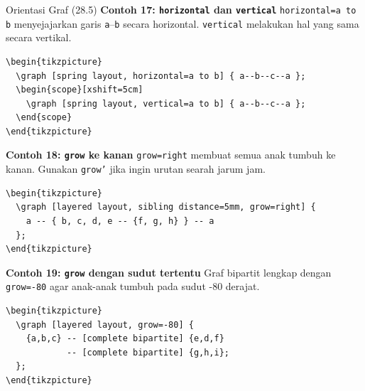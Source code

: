 \documentclass[aspectratio=169]{beamer}
\begin{document}
\begin{frame}{Orientasi Graf (28.5)}
\textbf{Contoh 17: \texttt{horizontal} dan \texttt{vertical}}
\texttt{horizontal=a to b} menyejajarkan garis \texttt{a}--\texttt{b} secara horizontal. \texttt{vertical} melakukan hal yang sama secara vertikal.
\begin{lstlisting}
\begin{tikzpicture}
  \graph [spring layout, horizontal=a to b] { a--b--c--a };
  \begin{scope}[xshift=5cm]
    \graph [spring layout, vertical=a to b] { a--b--c--a };
  \end{scope}
\end{tikzpicture}
\end{lstlisting}
\begin{center}\end{center}


\textbf{Contoh 18: \texttt{grow} ke kanan}
\texttt{grow=right} membuat semua anak tumbuh ke kanan. Gunakan \texttt{grow'} jika ingin urutan searah jarum jam.
\begin{lstlisting}
\begin{tikzpicture}
  \graph [layered layout, sibling distance=5mm, grow=right] {
    a -- { b, c, d, e -- {f, g, h} } -- a
  };
\end{tikzpicture}
\end{lstlisting}
\begin{center}\end{center}


\textbf{Contoh 19: \texttt{grow} dengan sudut tertentu}
Graf bipartit lengkap dengan \texttt{grow=-80} agar anak-anak tumbuh pada sudut -80 derajat.
\begin{lstlisting}
\begin{tikzpicture}
  \graph [layered layout, grow=-80] {
    {a,b,c} -- [complete bipartite] {e,d,f}
            -- [complete bipartite] {g,h,i};
  };
\end{tikzpicture}
\end{lstlisting}
\begin{center}\end{center}



\end{frame}
\end{document}
